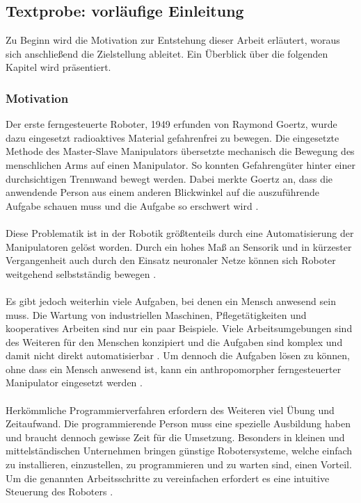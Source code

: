 \subsection{Textprobe: vorläufige Einleitung}
  Zu  Beginn wird die Motivation zur Entstehung dieser Arbeit erläutert, woraus sich anschließend die Zielstellung ableitet. Ein Überblick über die folgenden Kapitel wird präsentiert.
\subsubsection{Motivation}%
  Der erste ferngesteuerte Roboter, 1949 erfunden von Raymond Goertz, wurde dazu eingesetzt radioaktives Material gefahrenfrei zu bewegen. Die eingesetzte Methode des Master-Slave Manipulators übersetzte mechanisch die Bewegung des menschlichen Arms auf einen Manipulator. So konnten Gefahrengüter hinter einer durchsichtigen Trennwand bewegt werden. Dabei merkte Goertz an, dass die anwendende Person aus einem anderen Blickwinkel auf die auszuführende Aufgabe schauen muss und die Aufgabe so erschwert wird \cite{goertz_master-slave_1949}. \\\\
  Diese Problematik ist in der Robotik größtenteils durch eine Automatisierung der Manipulatoren gelöst worden. Durch ein hohes Maß an Sensorik und in kürzester Vergangenheit auch durch den Einsatz neuronaler Netze können sich Roboter weitgehend selbstständig bewegen \cite{siciliano_springer_2008}.\\\\
  Es gibt jedoch weiterhin viele Aufgaben, bei denen ein Mensch anwesend sein muss. Die Wartung von industriellen Maschinen, Pflegetätigkeiten und kooperatives Arbeiten sind nur ein paar Beispiele. Viele Arbeitsumgebungen sind des Weiteren für den Menschen konzipiert und die Aufgaben sind komplex und damit nicht direkt automatisierbar \cite{fritsche_first-person_2015}. Um dennoch die Aufgaben lösen zu können, ohne dass ein Mensch anwesend ist, kann ein anthropomorpher ferngesteuerter Manipulator eingesetzt werden \cite{tanie_mfi_2003}\cite[S.5]{stanczyk_development_2006}.\\\\
  Herkömmliche Programmierverfahren erfordern des Weiteren viel Übung und Zeitaufwand. Die programmierende Person muss eine spezielle Ausbildung haben und braucht dennoch gewisse Zeit für die Umsetzung. Besonders in kleinen und mittelständischen Unternehmen bringen günstige Robotersysteme, welche einfach zu installieren, einzustellen, zu programmieren und zu warten sind, einen Vorteil. Um die genannten Arbeitsschritte zu vereinfachen erfordert es eine intuitive Steuerung des Roboters \cite[S.76]{brogardh_present_2007} \cite[S.190]{ehlers_echtzeitfahige_2019}. \\\\
